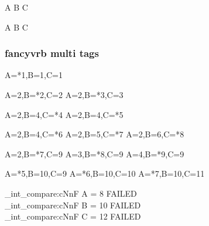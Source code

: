 \begin{CDRBlock} [
  tags=none,
  numbers=left,
  firstnumber=last,
]
A
B
C
\end{CDRBlock}
\ExplSyntaxOn
{}
\ExplSyntaxOff

\begin{CDRBlock} [
  tags=none,
  numbers=left,
  firstnumber=last,
]
A
B
C
\end{CDRBlock}
\ExplSyntaxOn
{}
\ExplSyntaxOff

\egroup

\subsubsection{\textsf{fancyvrb} multi tags}

\bgroup


\begin{CDRBlock} [
  tags={A,B,C},
  numbers=left,
  firstnumber=last,
]
A=*1,B=1,C=1
\end{CDRBlock}

\begin{CDRBlock} [
  tags={B,C},
  numbers=left,
  firstnumber=last,
]
A=2,B=*2,C=2
A=2,B=*3,C=3
\end{CDRBlock}

\begin{CDRBlock} [
  tags=C,
  numbers=left,
  firstnumber=last,
]
A=2,B=4,C=*4
A=2,B=4,C=*5
\end{CDRBlock}

\begin{CDRBlock} [
  tags={C, B},
  numbers=left,
  firstnumber=last,
]
A=2,B=4,C=*6
A=2,B=5,C=*7
A=2,B=6,C=*8
\end{CDRBlock}

\begin{CDRBlock} [
  tags={B, A},
  numbers=left,
  firstnumber=last,
]
A=2,B=*7,C=9
A=3,B=*8,C=9
A=4,B=*9,C=9
\end{CDRBlock}
\begin{CDRBlock} [
  tags={A,C},
  numbers=left,
  firstnumber=last,
]
A=*5,B=10,C=9
A=*6,B=10,C=10
A=*7,B=10,C=11
\end{CDRBlock}

\ExplSyntaxOn
\CDR_int_compare:cNnF { A } = 8 { FAILED \\ }
\CDR_int_compare:cNnF { B } = {10} { FAILED \\ }
\CDR_int_compare:cNnF { C } = {12} { FAILED \\ }
\ExplSyntaxOff

